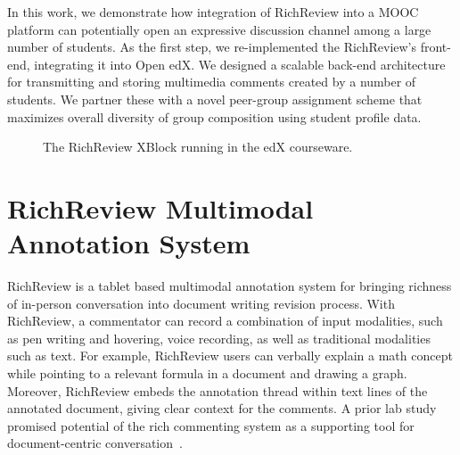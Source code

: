 \documentclass{sigchi}
\begin{document}
In this work, we demonstrate how integration of RichReview into a MOOC platform can potentially open an expressive discussion channel among a large number of students.
As the first step, we re-implemented the RichReview's front-end, integrating it into Open edX. We designed a scalable back-end architecture for transmitting and storing multimedia comments created by a number of students.
We partner these with a novel peer-group assignment scheme that maximizes overall diversity of group composition using student profile data.

\begin{figure}[!h]
\centering
{
\setlength{\fboxsep}{0pt}
\setlength{\fboxrule}{0.5pt}
}
\caption{The RichReview XBlock running in the edX courseware.}
\label{fig:screenshot}
\end{figure}


\section{RichReview Multimodal Annotation System}
RichReview is a tablet based multimodal annotation system for bringing richness of in-person conversation into document writing revision process.
With RichReview, a commentator can record a combination of input modalities, such as pen writing and hovering, voice recording, as well as traditional modalities such as text.
For example, RichReview users can verbally explain a math concept while pointing to a relevant formula in a document and drawing a graph.
Moreover, RichReview embeds the annotation thread within text lines of the annotated document, giving clear context for the comments.
A prior lab study promised potential of the rich commenting system as a supporting tool for document-centric conversation~\cite{you-know-this-one-better-than-i-do}.
\end{document}
